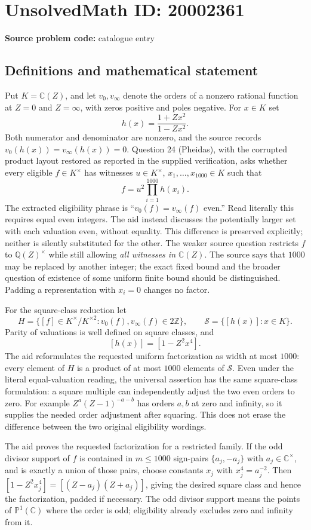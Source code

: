 \documentclass[11pt]{article}
\newcommand{\Z}{\mathbb{Z}}
\newcommand{\Q}{\mathbb{Q}}
\newcommand{\C}{\mathbb{C}}
\newcommand{\PP}{\mathbb{P}}
\begin{document}
\section*{UnsolvedMath ID: 20002361}
\textbf{Source problem code:} catalogue entry
\subsection{Definitions and mathematical statement}
Put $K=\C(Z)$, and let $v_0,v_\infty$ denote the orders of a nonzero rational function at $Z=0$ and $Z=\infty$, with zeros positive and poles negative. For $x\in K$ set
\[
h(x)=\frac{1+Zx^2}{1-Zx^2}.
\]
Both numerator and denominator are nonzero, and the source records $v_0(h(x))=v_\infty(h(x))=0$. Question 24 (Pheidas), with the corrupted product layout restored as reported in the supplied verification, asks whether every eligible $f\in K^\times$ has witnesses $u\in K^\times$, $x_1,\ldots,x_{1000}\in K$ such that
\[
f=u^2\prod_{i=1}^{1000}h(x_i).
\]
The extracted eligibility phrase is ``$v_0(f)=v_\infty(f)$ even.'' Read literally this requires equal even integers. The aid instead discusses the potentially larger set with each valuation even, without equality. This difference is preserved explicitly; neither is silently substituted for the other. The weaker source question restricts $f$ to $\Q(Z)^\times$ while still allowing \emph{all witnesses in $\C(Z)$}. The source says that $1000$ may be replaced by another integer; the exact fixed bound and the broader question of existence of some uniform finite bound should be distinguished. Padding a representation with $x_i=0$ changes no factor.

For the square-class reduction let
\[
H=\{[f]\in K^\times/K^{\times2}:v_0(f),v_\infty(f)\in2\Z\},\qquad
\mathcal S=\{[h(x)]:x\in K\}.
\]
Parity of valuations is well defined on square classes, and
\[
[h(x)]=[1-Z^2x^4].
\]
The aid reformulates the requested uniform factorization as width at most $1000$: every element of $H$ is a product of at most $1000$ elements of $\mathcal S$. Even under the literal equal-valuation reading, the universal assertion has the same square-class formulation: a square multiple can independently adjust the two even orders to zero. For example $Z^a(Z-1)^{-a-b}$ has orders $a,b$ at zero and infinity, so it supplies the needed order adjustment after squaring. This does not erase the difference between the two original eligibility wordings.

The aid proves the requested factorization for a restricted family. If the odd divisor support of $f$ is contained in $m\leq1000$ sign-pairs $\{a_j,-a_j\}$ with $a_j\in\C^\times$, and is exactly a union of those pairs, choose constants $x_j$ with $x_j^4=a_j^{-2}$. Then $[1-Z^2x_j^4]=[(Z-a_j)(Z+a_j)]$, giving the desired square class and hence the factorization, padded if necessary. The odd divisor support means the points of $\PP^1(\C)$ where the order is odd; eligibility already excludes zero and infinity from it.
\end{document}

